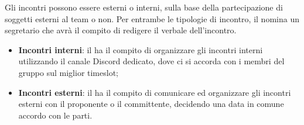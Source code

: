 Gli incontri possono essere esterni o interni, sulla base della partecipazione di soggetti esterni al team o non. Per entrambe le tipologie di incontro, il \respProg{} nomina un segretario che avrà il compito di redigere il verbale dell'incontro.
\begin{itemize}
\item \textbf{Incontri interni}: il \respProg{} ha il compito di organizzare gli incontri interni utilizzando il canale Discord dedicato, dove ci si accorda con i membri del gruppo sul miglior timeslot;
\item \textbf{Incontri esterni}: il \respProg{} ha il compito di comunicare ed organizzare gli incontri esterni con il proponente o il committente, decidendo una data in comune accordo con le parti.
\end{itemize}